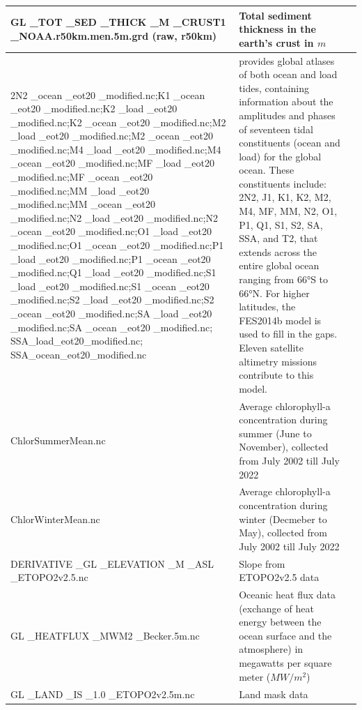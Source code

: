 \documentclass[journal abbreviation, manuscript]{copernicus}
\begin{document}
\begin{longtable}{|p{}|p{}|p{}|}
        \hline 
        GL \_TOT \_SED \_THICK \_M \_CRUST1 \_NOAA.r50km.men.5m.grd (raw, r50km) & Total sediment thickness in the earth's crust in $m$  & \cite{CRUST1_NOAA2013} \\
        \hline 2N2 \_ocean \_eot20 \_modified.nc;K1 \_ocean \_eot20 \_modified.nc;K2 \_load \_eot20 \_modified.nc;K2 \_ocean \_eot20 \_modified.nc;M2 \_load \_eot20 \_modified.nc;M2 \_ocean \_eot20 \_modified.nc;M4 \_load \_eot20 \_modified.nc;M4 \_ocean \_eot20 \_modified.nc;MF \_load \_eot20 \_modified.nc;MF \_ocean \_eot20 \_modified.nc;MM \_load \_eot20 \_modified.nc;MM \_ocean \_eot20 \_modified.nc;N2 \_load \_eot20 \_modified.nc;N2 \_ocean \_eot20 \_modified.nc;O1 \_load \_eot20 \_modified.nc;O1 \_ocean \_eot20 \_modified.nc;P1 \_load \_eot20 \_modified.nc;P1 \_ocean \_eot20 \_modified.nc;Q1 \_load \_eot20 \_modified.nc;S1 \_load \_eot20 \_modified.nc;S1 \_ocean \_eot20 \_modified.nc;S2 \_load \_eot20 \_modified.nc;S2 \_ocean \_eot20 \_modified.nc;SA \_load \_eot20 \_modified.nc;SA \_ocean \_eot20 \_modified.nc; SSA\_load\_eot20\_modified.nc; SSA\_ocean\_eot20\_modified.nc & \cite{HartDavis2021EOT20} provides global atlases of both ocean and load tides, containing information about the amplitudes and phases of seventeen tidal constituents (ocean and load) for the global ocean. These constituents include: 2N2, J1, K1, K2, M2, M4, MF, MM, N2, O1, P1, Q1, S1, S2, SA, SSA, and T2, that extends across the entire global ocean ranging from 66°S to 66°N. For higher latitudes, the FES2014b model is used to fill in the gaps. Eleven satellite altimetry missions contribute to this model. & \cite{HartDavis2021EOT20} \\
        \hline 
        ChlorSummerMean.nc & Average chlorophyll-a concentration during summer (June to November), collected from July 2002 till July 2022 &  \cite{nasaaqua}\\
        \hline 
        ChlorWinterMean.nc & Average chlorophyll-a concentration during winter (Decmeber to May), collected from July 2002 till July 2022 &  \cite{nasaaqua}\\
        \hline 
        DERIVATIVE \_GL \_ELEVATION \_M \_ASL \_ETOPO2v2.5.nc & Slope from ETOPO2v2.5 data &  \\
        \hline 
        GL \_HEATFLUX \_MWM2 \_Becker.5m.nc & Oceanic heat flux data (exchange of heat energy between the ocean surface and the atmosphere) in megawatts per square meter ($MW/m^2$) & \cite{becker2014} \\
        \hline
        GL \_LAND \_IS \_1.0 \_ETOPO2v2.5m.nc & Land mask data & \cite{ETOPO2v22006} \\

\end{longtable}
\end{document}

